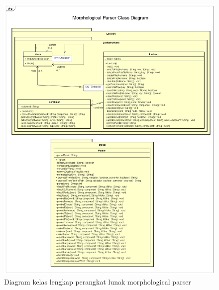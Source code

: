\begin{figure}[H]
\centering
\includegraphics[scale=0.4]{Gambar/gambar-diagram-kelas-final}
\caption{Diagram kelas lengkap perangkat lunak morphological parser} 
\label{gambar-diagram-kelas-final}
\end{figure}